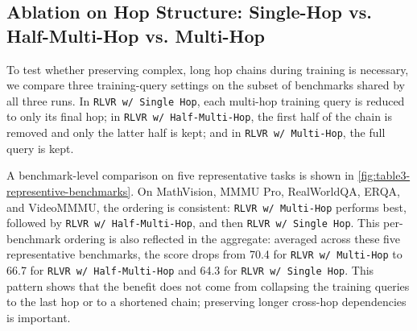 \subsection{Ablation on Hop Structure: Single-Hop vs. Half-Multi-Hop vs. Multi-Hop}
\label{sec:exp-hop-structure-ablation}
To test whether preserving complex, long hop chains during training is necessary, we compare three training-query settings on the subset of benchmarks shared by all three runs.
In \texttt{RLVR w/ Single Hop}, each multi-hop training query is reduced to only its final hop; in \texttt{RLVR w/ Half-Multi-Hop}, the first half of the chain is removed and only the latter half is kept; and in \texttt{RLVR w/ Multi-Hop}, the full query is kept.

\newcommand{\MethodSingleHop}{\shortstack[c]{RLVR w/\\Single Hop}}
\newcommand{\MethodHalfHop}{\shortstack[c]{RLVR w/\\Half-Multi-Hop}}
\newcommand{\MethodMultiHop}{\shortstack[c]{RLVR w/\\Multi-Hop}}
\newlength{\HopBenchmarkColWidth}
\newlength{\HopResultColWidth}
\setlength{\HopBenchmarkColWidth}{0.28\linewidth}
\setlength{\HopResultColWidth}{\dimexpr(\linewidth-\HopBenchmarkColWidth)/3\relax}
\newcommand{\HopComparisonHeaderRow}{%
\multicolumn{4}{@{}l@{}}{%
  \begingroup
  \setlength{\fboxsep}{0pt}%
  \colorbox{black!5}{%
    \parbox{\linewidth}{%
      \strut
      \makebox[\HopBenchmarkColWidth][l]{\parbox[c][2.6\baselineskip][c]{\HopBenchmarkColWidth}{\raggedright Benchmark}}%
      \makebox[\HopResultColWidth][c]{\parbox[c][2.6\baselineskip][c]{\HopResultColWidth}{\centering \MethodSingleHop}}%
      \makebox[\HopResultColWidth][c]{\parbox[c][2.6\baselineskip][c]{\HopResultColWidth}{\centering \MethodHalfHop}}%
      \makebox[\HopResultColWidth][c]{\parbox[c][2.6\baselineskip][c]{\HopResultColWidth}{\centering \MethodMultiHop}}%
      \strut
    }%
  }%
  \endgroup
}%
\\}

A benchmark-level comparison on five representative tasks is shown in \cref{fig:table3-representive-benchmarks}.
On MathVision, MMMU Pro, RealWorldQA, ERQA, and VideoMMMU, the ordering is consistent: \texttt{RLVR w/ Multi-Hop} performs best, followed by \texttt{RLVR w/ Half-Multi-Hop}, and then \texttt{RLVR w/ Single Hop}.
This per-benchmark ordering is also reflected in the aggregate: averaged across these five representative benchmarks, the score drops from 70.4 for \texttt{RLVR w/ Multi-Hop} to 66.7 for \texttt{RLVR w/ Half-Multi-Hop} and 64.3 for \texttt{RLVR w/ Single Hop}.
This pattern shows that the benefit does not come from collapsing the training queries to the last hop or to a shortened chain; preserving longer cross-hop dependencies is important.

